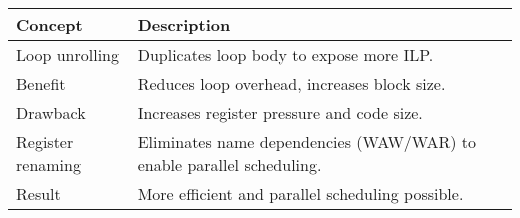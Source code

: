 \begin{table}[!htp]
    \centering
    \begin{tabular}{@{} l p{25em} @{}}
        \toprule
        Concept & Description \\
        \midrule
        Loop unrolling    & Duplicates loop body to expose more ILP.                                 \\ [.3em]
        Benefit           & Reduces loop overhead, increases block size.                             \\ [.3em]
        Drawback          & Increases register pressure and code size.                               \\ [.3em]
        Register renaming & Eliminates name dependencies (WAW/WAR) to enable parallel scheduling.    \\ [.3em]
        Result            & More efficient and parallel scheduling possible.                         \\
        \bottomrule
    \end{tabular}
\end{table}

